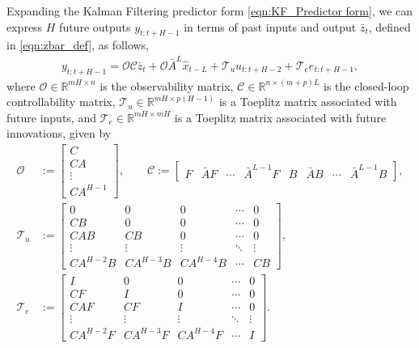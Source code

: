 \documentclass[11pt]{article}
\newcommand{\Abar}{\bar{A}}
\newcommand{\zbar}{\bar{z}}
\newcommand{\xtil}{\hat{x}}
\newcommand{\Ccal}{\mathcal{C}}
\newcommand{\Hcal}{\mathcal{H}}
\newcommand{\Ocal}{\mathcal{O}}
\newcommand{\Tcal}{\mathcal{T}}
\newcommand{\R}{\mathbb{R}}				%
\newcommand{\<}{\langle}
\renewcommand{\>}{\rangle}
\numberwithin{equation}{section}
\begin{document}
Expanding the Kalman Filtering predictor form \eqref{eqn:KF_Predictor form}, we can express $H$ future outputs $y_{t:t+H-1}$ in terms of past inputs and output $\zbar_t$, defined in \eqref{eqn:zbar_def}, as follows,
\begin{align}
    y_{t:t+H-1} %
    = \Ocal \Ccal \zbar_t + \Ocal \Abar^L \xtil_{t-L} + \Tcal_u u_{t:t+H-2} + \Tcal_e e_{t:t+H-1}, \label{eqn:Hankel map factored} 
\end{align}
where $\Ocal \in \R^{mH \times n}$ is the observability matrix, $\Ccal \in \R^{n \times (m+p)L}$ is the closed-loop controllability matrix, $\Tcal_{u} \in \R^{mH \times p(H-1)}$ is a Toeplitz matrix associated with future inputs, and $\Tcal_{e} \in \R^{mH \times mH}$ is a Toeplitz matrix associated with future innovations, given by
\begin{align}
   \Ocal&:= \begin{bmatrix} 
    C \\ C A \\ \vdots \\ C A^{H-1}\end{bmatrix}, \qquad 
    \Ccal := \begin{bmatrix} 
    F & \Abar F & \cdots &\Abar^{L-1} F & B & \Abar B & \cdots &\Abar^{L-1} B   \end{bmatrix}, \label{eqn:Ocal_Ccal} \\
    \Tcal_u &:= \begin{bmatrix} 
    0 & 0  & 0 &\cdots & 0 \\
    C B & 0 & 0 &\cdots & 0 \\
    C A B & C B  & 0 & \cdots & 0 \\
    \vdots & \vdots & \vdots & \ddots &\vdots \\
    C A^{H-2} B & C A^{H-3}B & C A^{H-4} B & \cdots & C B 
    \end{bmatrix}, \label{eqn:Tcal_u} \\
    \Tcal_e &:= \begin{bmatrix} 
    I & 0  & 0 & \cdots & 0 \\
    C F & I & 0 & \cdots & 0 \\
    C A F & C F  & I & \cdots & 0 \\
    \vdots & \vdots & \vdots & \ddots &\vdots \\
    C A^{H-2} F & C A^{H-3} F & C A^{H-4} F & \cdots & I 
    \end{bmatrix}. \label{eqn:Tcal_e}
\end{align}
\end{document}
